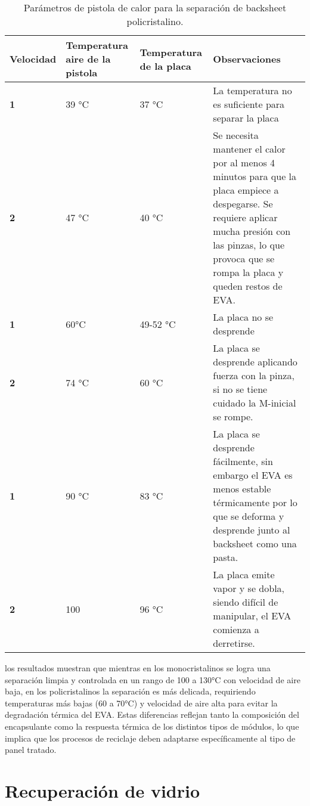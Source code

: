 \begin{table}[htb]
	\caption{Parámetros de pistola de calor para la separación de backsheet policristalino.}
	\vspace{-0.5em} %
	\label{tab:PistolaPoli}
	\begin{center}
		\begin{tabular}{|p{2cm}||p{3cm}|p{3cm}|p{4cm}|}\hline
			\textbf{Velocidad} & \textbf{Temperatura aire de la pistola} & \textbf{Temperatura de la placa}&\textbf{Observaciones}\\ \hline
			\textbf{1} & 39 °C & 37 °C & La temperatura no es suficiente para separar la placa \\ \hline
			\textbf{2} & 47 °C & 40 °C & Se necesita mantener el calor por al menos 4 minutos para que la placa empiece a despegarse. Se requiere aplicar mucha presión con las pinzas, lo que provoca que se rompa la placa y queden restos de EVA.\\ \hline
			\textbf{1} & 60°C & 49-52 °C & La placa no se desprende\\ \hline
			\textbf{2} & 74 °C & 60 °C & La placa se desprende aplicando fuerza con la pinza, si no se tiene cuidado la M-inicial se rompe.\\ \hline
			\textbf{1} & 90 °C & 83 °C & La placa se desprende fácilmente, sin embargo el EVA es menos estable térmicamente por lo que se deforma y desprende junto al backsheet como una pasta.\\ \hline	
			\textbf{2} & 100 & 96 °C & La placa emite vapor y se dobla, siendo difícil de manipular, el EVA comienza a derretirse.\\ \hline
		\end{tabular}
	\end{center}
\end{table} 

los resultados muestran que mientras en los monocristalinos se logra una separación limpia y controlada en un rango de 100 a 130°C con velocidad de aire baja, en los policristalinos la separación es más delicada, requiriendo temperaturas más bajas (60 a 70°C) y velocidad de aire alta para evitar la degradación térmica del EVA. Estas diferencias reflejan tanto la composición del encapsulante como la respuesta térmica de los distintos tipos de módulos, lo que implica que los procesos de reciclaje deben adaptarse específicamente al tipo de panel tratado.
\clearpage

\newpage
\section{Recuperación de vidrio} 


